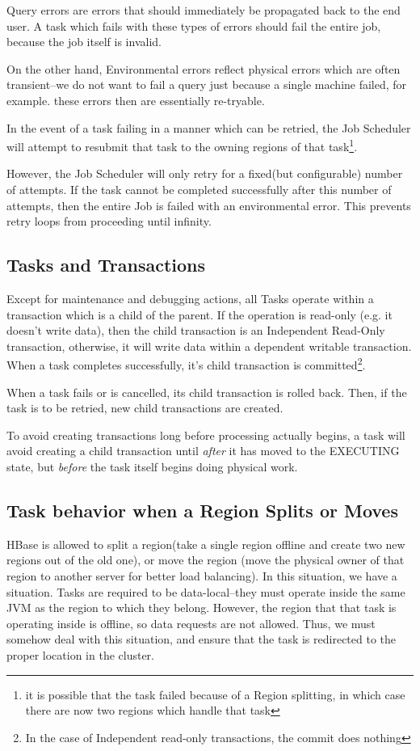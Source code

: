 Query errors are errors that should immediately be propagated back to the end user. A task which fails with these types of errors should fail the entire job, because the job itself is invalid.

On the other hand, Environmental errors reflect physical errors which are often transient--we do not want to fail a query just because a single machine failed, for example. these errors then are essentially re-tryable.

In the event of a task failing in a manner which can be retried, the Job Scheduler will attempt to resubmit that task to the owning regions of that task\footnote{it is possible that the task failed because of a Region splitting, in which case there are now two regions which handle that task}. 

However, the Job Scheduler will only retry for a fixed(but configurable) number of attempts. If the task cannot be completed successfully after this number of attempts, then the entire Job is failed with an environmental error. This prevents retry loops from proceeding until infinity.

\subsection{Tasks and Transactions}
Except for maintenance and debugging actions, all Tasks operate within a transaction which is a child of the parent. If the operation is read-only (e.g. it doesn't write data), then the child transaction is an Independent Read-Only transaction, otherwise, it will write data within a dependent writable transaction. When a task completes successfully, it's child transaction is committed\footnote{In the case of Independent read-only transactions, the commit does nothing}. 

When a task fails or is cancelled, its child transaction is rolled back. Then, if the task is to be retried, new child transactions are created.

To avoid creating transactions long before processing actually begins, a task will avoid creating a child transaction until \emph{after} it has moved to the EXECUTING state, but \emph{before} the task itself begins doing physical work.

\subsection{Task behavior when a Region Splits or Moves}
HBase is allowed to split a region(take a single region offline and create two new regions out of the old one), or move the region (move the physical owner of that region to another server for better load balancing). In this situation, we have a situation. Tasks are required to be data-local--they must operate inside the same JVM as the region to which they belong. However, the region that that task is operating inside is offline, so data requests are not allowed. Thus, we must somehow deal with this situation, and ensure that the task is redirected to the proper location in the cluster.

